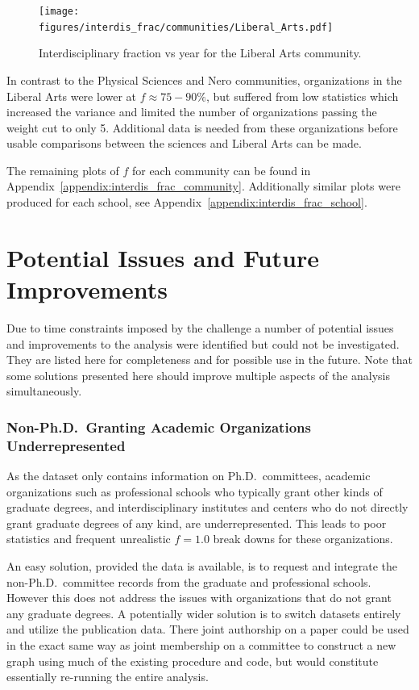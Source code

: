 \documentclass[notitlepage,aps,prd,nofootinbib]{revtex4-1}
\newcommand{\figures}{../outputs/plots}
\begin{document}
\begin{figure}[!htb]\centering
  \texttt{[image: \\figures/interdis\_frac/communities/Liberal\_Arts.pdf]}
  \caption{Interdisciplinary fraction vs year for the Liberal Arts community.}
  \label{fig:interdis_frac_liberal_arts}
\end{figure}

In contrast to the Physical Sciences and Nero communities, organizations in the Liberal Arts were lower at $f \approx 75-90\%$, but suffered from low statistics which increased the variance and limited the number of organizations passing the weight cut to only 5. Additional data is needed from these organizations before usable comparisons between the sciences and Liberal Arts can be made.

The remaining plots of $f$ for each community can be found in Appendix~\ref{appendix:interdis_frac_community}. Additionally similar plots were produced for each school, see Appendix~\ref{appendix:interdis_frac_school}.


\section{Potential Issues and Future Improvements}
\label{sec:future}
Due to time constraints imposed by the challenge a number of potential issues and improvements to the analysis were identified but could not be investigated. They are listed here for completeness and for possible use in the future. Note that some solutions presented here should improve multiple aspects of the analysis simultaneously.

\subsubsection{Non-Ph.D.\ Granting Academic Organizations Underrepresented}
As the  dataset only contains information on Ph.D.\ committees, academic organizations such as professional schools who typically grant other kinds of graduate degrees, and interdisciplinary institutes and centers who do not directly grant graduate degrees of any kind, are underrepresented. This leads to poor statistics and frequent unrealistic $f=1.0$ break downs for these organizations.

An easy solution, provided the data is available, is to request and integrate the non-Ph.D.\ committee records from the graduate and professional schools. However this does not address the issues with organizations that do not grant any graduate degrees. A potentially wider solution is to switch datasets entirely and utilize the  publication data. There joint authorship on a paper could be used in the exact same way as joint membership on a committee to construct a new graph using much of the existing procedure and code, but would constitute essentially re-running the entire analysis.
\end{document}
